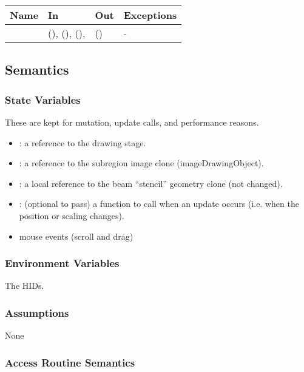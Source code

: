 \documentclass[12pt, titlepage]{article}
\begin{document}
\begin{center}
\begin{tabular}{L{4cm} L{5cm} L{4cm} L{2cm}}
\hline
\textbf{Name} & \textbf{In} & \textbf{Out} & \textbf{Exceptions} \\
\hline
{} &  (),
   (),  (),
  &  () & - \\
\hline
\end{tabular}
\end{center}

\subsection{Semantics}

\subsubsection{State Variables}
These are kept for mutation, update calls, and performance reasons.
\begin{itemize}
  \item {}: a reference to the drawing stage.
  \item {}: a reference to the subregion image clone (imageDrawingObject).
  \item {}: a local reference to the beam ``stencil'' geometry clone (not changed).
  \item {}: (optional to pass) a function to call when an update occurs
  (i.e. when the  position or scaling changes).
  \item mouse events (scroll and drag)
\end{itemize}

\subsubsection{Environment Variables}
The HIDs.

\subsubsection{Assumptions}
None

\subsubsection{Access Routine Semantics}
\end{document}
